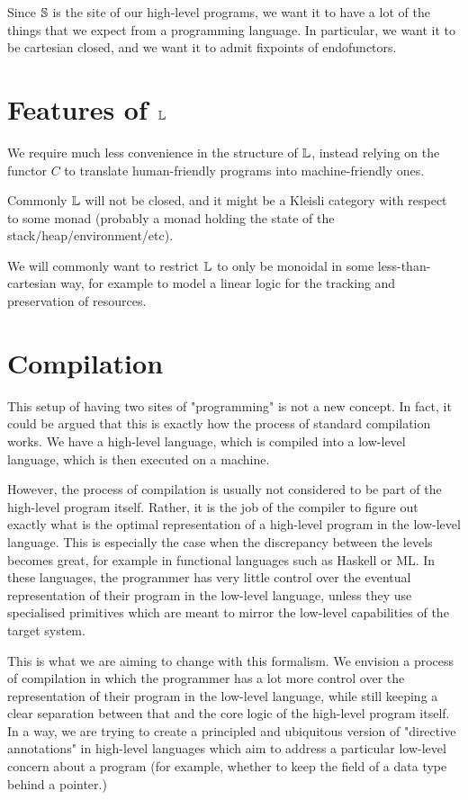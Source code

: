 Since $\S$ is the site of our high-level programs, we want it to have a lot of
the things that we expect from a programming language. In particular, we want
it to be cartesian closed, and we want it to admit fixpoints of endofunctors.

\section{Features of $\L$}

We require much less convenience in the structure of $\L$, instead relying on
the functor $C$ to translate human-friendly programs into machine-friendly
ones.

Commonly $\L$ will not be closed, and it might be a Kleisli category with
respect to some monad (probably a monad holding the state of the
stack/heap/environment/etc).

We will commonly want to restrict $\L$ to only be monoidal in some
less-than-cartesian way, for example to model a linear logic for the tracking
and preservation of resources.

\section{Compilation}

This setup of having two sites of "programming" is not a new concept. In fact,
it could be argued that this is exactly how the process of standard compilation
works. We have a high-level language, which is compiled into a low-level
language, which is then executed on a machine.

However, the process of compilation is usually not considered to be part of the
high-level program itself. Rather, it is the job of the compiler to figure out
exactly what is the optimal representation of a high-level program in the
low-level language. This is especially the case when the discrepancy between
the levels becomes great, for example in functional languages such as Haskell
or ML. In these languages, the programmer has very little control over the
eventual representation of their program in the low-level language, unless they
use specialised primitives which are meant to mirror the low-level capabilities
of the target system.

This is what we are aiming to change with this formalism. We envision a process
of compilation in which the programmer has a lot more control over the
representation of their program in the low-level language, while still keeping
a clear separation between that and the core logic of the high-level program
itself. In a way, we are trying to create a principled and ubiquitous version
of "directive annotations" in high-level languages which aim to address a
particular low-level concern about a program (for example, whether to keep the
field of a data type behind a pointer.)

